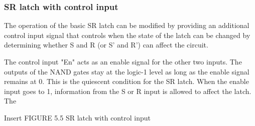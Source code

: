 \subsubsection{SR latch with control input}
The operation of the basic SR latch can be modified by providing an additional control input signal that controls when the state of the latch can be changed by determining whether S and R (or S' and R') can affect the circuit.

\par The control input "En" acts as an enable signal for the other two inputs. The outputs of the NAND gates stay at the logic-1 level as long as the enable signal remains at 0. This is the quiescent
condition for the SR latch. When the enable input goes to 1, information from the S or R
input is allowed to affect the latch. The

\begin{highlight}
    Insert FIGURE 5.5 SR latch with control input
\end{highlight}